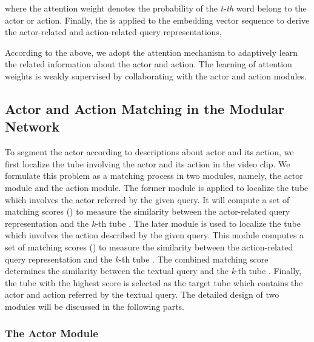 \documentclass[journal]{IEEEtran}
\begin{document}
where the attention weight  denotes the probability of the \emph{t-th} word belong to the actor or action. Finally, the  is applied to the embedding vector sequence  to derive the actor-related and action-related query representations,


According to the above, we adopt the attention mechanism to adaptively learn the related information about the actor and action. The learning of attention weights is weakly supervised by collaborating with the actor and action modules.

\subsection{Actor and Action Matching in the Modular Network}
\label{section: modular_network}

To segment the actor according to descriptions about actor and its action, we first localize the tube involving the actor and its action in the video clip. We formulate this problem as a matching process in two modules, namely, the actor module and the action module. The former module is applied to localize the tube which involves the actor referred by the given query. It will compute a set of matching scores  () to measure the similarity between the actor-related query representation  and the \emph{k}-th tube . The later module is used to localize the tube which involves the action described by the given query. This module computes a set of matching scores  () to measure the similarity between the action-related query representation  and the \emph{k}-th tube . The combined matching score   determines the similarity between the textual query  and the \emph{k}-th tube . Finally, the tube with the highest score is selected as the target tube which contains the actor and action referred by the textual query. The detailed design of two modules will be discussed in the following parts.

\subsubsection{The Actor Module}
\label{section: actor_module}
\end{document}
